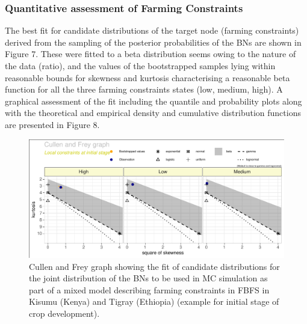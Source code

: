 \documentclass[12pt,oneside]{article}
\begin{document}
\hypertarget{I16}{%
\subsubsection{Quantitative assessment of Farming Constraints}\label{I16}}

The best fit for candidate distributions of the target node (farming constraints) derived from the sampling of the posterior probabilities of the BNs are shown in Figure 7. These were fitted to a beta distribution seems owing to the nature of the data (ratio), and the values of the bootstrapped samples lying within reasonable bounds for skewness and kurtosis characterising a reasonable beta function for all the three farming constraints states (low, medium, high). A graphical assessment of the fit including the quantile and probability plots along with the theoretical and empirical density and cumulative distribution functions are presented in Figure 8.

\begin{figure}[!htbp]

{\centering \includegraphics{Modelling_FBFS_Supplement_files/figure-latex/fig7-1} 

}

\caption{Cullen and Frey graph showing the fit of candidate distributions for the joint distribution of the BNs to be used in MC simulation as part of a mixed model describing farming constraints in FBFS in Kisumu (Kenya) and Tigray (Ethiopia) (example for initial stage of crop development).}\label{fig:fig7}
\end{figure}
\end{document}
